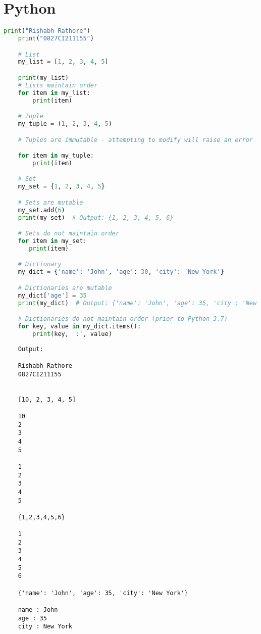\documentclass{report}
\begin{document}
\pagebreak

\setcounter{chapter}{1}
\setcounter{section}{0}
\section{Python}

\sol 
\begin{lstlisting}[language=Python]
	print("Rishabh Rathore")
	print("0827CI211155")

	# List
	my_list = [1, 2, 3, 4, 5]

	print(my_list)
	# Lists maintain order
	for item in my_list:
    	print(item)

	# Tuple
	my_tuple = (1, 2, 3, 4, 5)

	# Tuples are immutable - attempting to modify will raise an error

	for item in my_tuple:
    	print(item)

	# Set
	my_set = {1, 2, 3, 4, 5}

	# Sets are mutable
	my_set.add(6)
	print(my_set)  # Output: {1, 2, 3, 4, 5, 6}

	# Sets do not maintain order
	for item in my_set:
 	   print(item)

	# Dictionary
	my_dict = {'name': 'John', 'age': 30, 'city': 'New York'}

	# Dictionaries are mutable
	my_dict['age'] = 35
	print(my_dict)  # Output: {'name': 'John', 'age': 35, 'city': 'New York'}

	# Dictionaries do not maintain order (prior to Python 3.7)
	for key, value in my_dict.items():
    	print(key, ':', value)


\end{lstlisting}

\begin{verbatim}
	Output:

	Rishabh Rathore
	0827CI211155


	[10, 2, 3, 4, 5]

	10
	2
	3
	4
	5

	1
	2
	3
	4
	5

	{1,2,3,4,5,6}

	1
	2
	3
	4
	5
	6

	{'name': 'John', 'age': 35, 'city': 'New York'}

	name : John
	age : 35
	city : New York

\end{verbatim}
\end{document}

